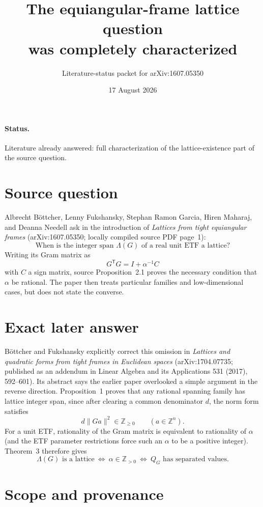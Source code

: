 \documentclass[11pt]{article}
\title{The equiangular-frame lattice question\\was completely characterized}
\author{Literature-status packet for arXiv:1607.05350}
\date{17 August 2026}
\begin{document}
\maketitle

\paragraph{Status.}
Literature already answered: full characterization of the lattice-existence
part of the source question.

\section*{Source question}

Albrecht Böttcher, Lenny Fukshansky, Stephan Ramon Garcia, Hiren Maharaj,
and Deanna Needell ask in the introduction of
\emph{Lattices from tight equiangular frames} (arXiv:1607.05350; locally
compiled source PDF page~1):
\[
 \boxed{\text{When is the integer span \(\Lambda(G)\) of a real unit ETF a lattice?}}
\]
Writing its Gram matrix as
\[
 G^{\mathsf T}G=I+\alpha^{-1}C
\]
with \(C\) a sign matrix, source Proposition~2.1 proves the necessary
condition that \(\alpha\) be rational. The paper then treats particular
families and low-dimensional cases, but does not state the converse.

\section*{Exact later answer}

Böttcher and Fukshansky explicitly correct this omission in
\emph{Lattices and quadratic forms from tight frames in Euclidean spaces}
(arXiv:1704.07735; published as an addendum in Linear Algebra and its
Applications 531 (2017), 592--601). Its abstract says the earlier paper
overlooked a simple argument in the reverse direction. Proposition~1
proves that any rational spanning family has lattice integer span, since
after clearing a common denominator \(d\), the norm form satisfies
\[
 d\|Ga\|^2\in\mathbb Z_{\geq 0}\qquad(a\in\mathbb Z^n).
\]
For a unit ETF, rationality of the Gram matrix is equivalent to rationality
of \(\alpha\) (and the ETF parameter restrictions force such an \(\alpha\)
to be a positive integer). Theorem~3 therefore gives
\[
 \boxed{\;
 \Lambda(G)\text{ is a lattice}
 \ \Longleftrightarrow\
 \alpha\in\mathbb Z_{>0}
 \ \Longleftrightarrow\
 Q_G\text{ has separated values}.
 \;}
\]

\section*{Scope and provenance}
\end{document}
